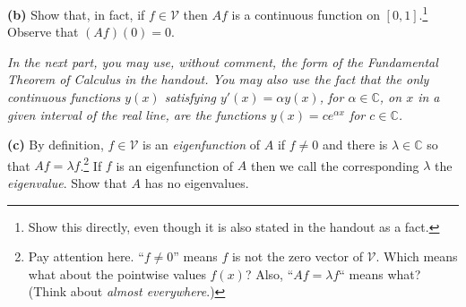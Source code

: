 \documentclass[12pt]{amsart}
\newcommand{\cV}{\mathcal{V}}
\newcommand{\CC}{\mathbb{C}}
\newcommand{\epart}[1]{\medskip\noindent\textbf{(#1)}\quad }
\newcommand{\nex}{\medskip\noindent}
\begin{document}
\medskip
\epart{b}  Show that, in fact, if $f\in \cV$ then $Af$ is a continuous function on $[0,1]$.\footnote{Show this directly, even though it is also stated in the handout as a fact.}  Observe that $(Af)(0)=0$.

\nex \emph{In the next part, you may use, without comment, the form of the Fundamental Theorem of Calculus in the handout.  You may also use the fact that the only continuous functions $y(x)$ satisfying $y'(x) = \alpha y(x)$, for $\alpha\in\CC$, on $x$ in a given interval of the real line, are the functions $y(x) = c e^{\alpha x}$ for $c\in\CC$.}

\medskip

\epart{c}  By definition, $f \in \cV$ is an \emph{eigenfunction} of $A$ if $f\ne 0$ and there is $\lambda \in \CC$ so that $Af=\lambda f$.\footnote{Pay attention here. ``$f\ne 0$'' means $f$ is not the zero vector of $\cV$.  Which means what about the pointwise values $f(x)$?  Also, ``$Af=\lambda f$`` means what?  (Think about \emph{almost everywhere}.)}  If $f$ is an eigenfunction of $A$ then we call the corresponding $\lambda$ the \emph{eigenvalue}.  Show that $A$ has no eigenvalues.
\end{document}
